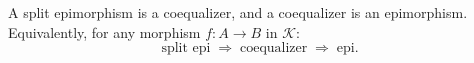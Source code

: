 A split epimorphism is a coequalizer, and a coequalizer is an epimorphism. Equivalently, for any morphism $f: A \longrightarrow B$ in $\mathcal{K}$:
$$
\text{split epi} \;\Longrightarrow\; \text{coequalizer} \;\Longrightarrow\; \text{epi}.
$$
